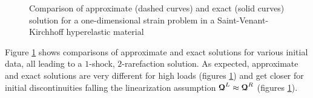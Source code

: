 \begin{figure}[h!]
  \centering
  {  \label{subfig:SVK_Approx1}}
  {  \label{subfig:SVK_Approx4}}
  \caption{Comparison of approximate (dashed curves) and exact (solid curves) solution for a one-dimensional strain problem in a Saint-Venant-Kirchhoff hyperelastic material}
  \label{fig:comparison_exact_approx}
\end{figure}

Figure \ref{fig:comparison_exact_approx} shows comparisons of approximate and exact solutions for various initial data, all leading to a $1$-shock, $2$-rarefaction solution. As expected, approximate and exact solutions are very different for high loads (figures \ref{fig:comparison_exact_approx}) and get closer for initial discontinuities falling the linearization assumption ${\boldsymbol{\mathcal{Q}}}^L\approx {\boldsymbol{\mathcal{Q}}}^R$ (figures \ref{fig:comparison_exact_approx}).

